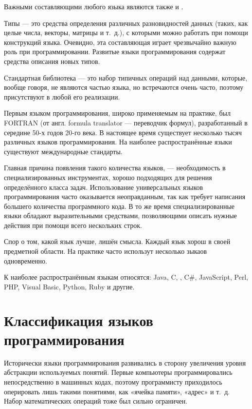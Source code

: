 Важными составляющими любого языка являются также
 и
.

Типы — это средства определения различных разновидностей данных
(таких, как целые числа, векторы, матрицы и т.~д.), с которыми можно
работать при помощи конструкций языка. Очевидно, эта составляющая
играет чрезвычайно важную роль при программировании. Развитые языки
программирования содержат средства описания новых типов.

Стандартная библиотека — это набор типичных операций над данными,
которые, вообще говоря, не являются частью языка, но встречаются очень
часто, поэтому присутствуют в любой его реализации.

Первым языком программирования, широко применяемым на практике, был
FORTRAN (от англ. formula translator — переводчик формул),
разработанный в середине 50-х годов 20-го века. В настоящее время
существует несколько тысяч различных языков программирования. На
наиболее распространённые языки существуют международные
стандарты.

Главная причина появления такого количества языков, — необходимость в
специализированных инструментах, хорошо подходящих для решения
определённого класса задач.  Использование универсальных языков
программирования часто оказывается неоправданным, так как требует
написания большего количества программного кода. В то же время
специализированные языки обладают выразительными средствами,
позволяющими описать нужные действия при помощи всего нескольких
строк.

Спор о том, какой язык лучше, лишён смысла. Каждый язык хорош в своей
предметной области. На практике часто использут несколько зыкаов
одновременно.

К наиболее распространённым языкам относятся: Java, C, \CPP, C\#,
JavaScript, Perl, PHP, Visual Basic, Python, Ruby и другие.

\section{Классификация языков программирования}

Исторически языки программирования развивались в сторону увеличения
уровня абстракции используемых понятий. Первые компьютеры
программировались непосредственно в машинных кодах, поэтому
программисту приходилось оперировать лишь такими понятиями, как
«ячейка памяти», «адрес» и т.~д. Набор математических операций тоже
был сильно ограничен.

